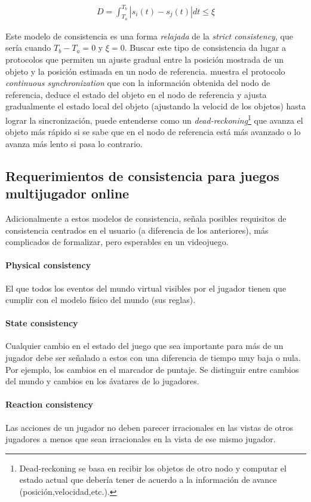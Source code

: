\begin{align*}
    D = \int_{T_a}^{T_b}|s_i(t) - s_j(t)| dt \leq \xi
\end{align*}

Este modelo de consistencia es una forma \emph{relajada} de la \emph{strict consistency}, que sería cuando $T_b-T_a = 0$ y $\xi = 0$. Buscar este tipo de consistencia da lugar a protocolos que permiten un ajuste gradual entre la posición mostrada de un objeto y la posición estimada en un nodo de referencia. \cite{li2004supporting} muestra el protocolo \emph{continuous synchronization} que con la información obtenida del nodo de referencia, deduce el estado del objeto en el nodo de referencia y ajusta gradualmente el estado local del objeto (ajustando la velocid de los objetos) hasta lograr la sincronización, puede entenderse como un \emph{dead-reckoning}\footnote{Dead-reckoning se basa en recibir los objetos de otro nodo y computar el estado actual que debería tener de acuerdo a la información de avance (posición,velocidad,etc.).} que avanza el objeto más rápido si se sabe que en el nodo de referencia está más avanzado o lo avanza más lento si pasa lo contrario.

\subsection{Requerimientos de consistencia para juegos multijugador online}

Adicionalmente a estos modelos de consistencia, \cite{palant2006consistency} señala posibles requisitos de consistencia centrados en el usuario (a diferencia de los anteriores), más complicados de formalizar, pero esperables en un videojuego.

\paragraph{Physical consistency} El que todos los eventos del mundo virtual visibles por el jugador tienen que cumplir con el modelo físico del mundo (sus reglas).

\paragraph{State consistency} Cualquier cambio en el estado del juego que sea importante para más de un jugador debe ser señalado a estos con una diferencia de tiempo muy baja o nula. Por ejemplo, los cambios en el marcador de puntaje. Se distinguir entre cambios del mundo y cambios en los ávatares de lo jugadores.

\paragraph{Reaction consistency} Las acciones de un jugador no deben parecer irracionales en las vistas de otros jugadores a menos que sean irracionales en la vista de ese mismo jugador.
